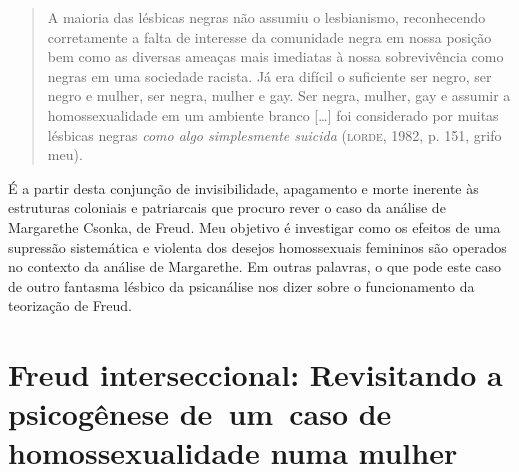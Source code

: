 \begin{quote}
A maioria das lésbicas negras não assumiu o lesbianismo, reconhecendo
corretamente a falta de interesse da comunidade negra em nossa posição
bem como as diversas ameaças mais imediatas à nossa sobrevivência como
negras em uma sociedade racista. Já era difícil o suficiente ser negro,
ser negro e mulher, ser negra, mulher e gay. Ser negra, mulher, gay e
assumir a homossexualidade em um ambiente branco {[}\ldots{}{]} foi
considerado por muitas lésbicas negras \emph{como algo simplesmente
suicida} (\textsc{lorde}, 1982, p. 151, grifo meu).
\end{quote}

É a partir desta conjunção de invisibilidade, apagamento e morte
inerente às estruturas coloniais e patriarcais que procuro rever o caso
da análise de Margarethe Csonka, de Freud. Meu objetivo é investigar
como os efeitos de uma supressão sistemática e violenta dos desejos
homossexuais femininos são operados no contexto da análise de
Margarethe. Em outras palavras, o que pode este caso de outro fantasma
lésbico da psicanálise nos dizer sobre o funcionamento da teorização de
Freud.

\section{Freud interseccional: Revisitando a psicogênese de~um~caso de
homossexualidade numa mulher}

